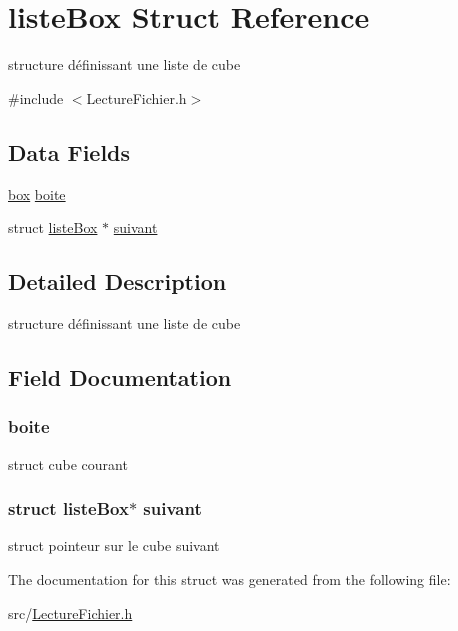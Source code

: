 \hypertarget{structliste_box}{
\section{listeBox Struct Reference}
\label{structliste_box}
}


structure définissant une liste de cube  




{\ttfamily \#include $<$LectureFichier.h$>$}

\subsection*{Data Fields}
\begin{DoxyCompactItemize}
\item 
\hyperlink{structbox}{box} \hyperlink{structliste_box_ae82892ba99cc7ad18186cb4883c2d2bd}{boite}
\item 
struct \hyperlink{structliste_box}{listeBox} $\ast$ \hyperlink{structliste_box_a8ec32af7a24ce88bbdfc453dd5bb0272}{suivant}
\end{DoxyCompactItemize}


\subsection{Detailed Description}
structure définissant une liste de cube 

\subsection{Field Documentation}
\hypertarget{structliste_box_ae82892ba99cc7ad18186cb4883c2d2bd}{
\subsubsection[{boite}]{ {\bf boite}}}
\label{structliste_box_ae82892ba99cc7ad18186cb4883c2d2bd}
struct cube courant \hypertarget{structliste_box_a8ec32af7a24ce88bbdfc453dd5bb0272}{
\subsubsection[{suivant}]{\setlength{\rightskip}{0pt plus 5cm}struct {\bf listeBox}$\ast$ {\bf suivant}}}
\label{structliste_box_a8ec32af7a24ce88bbdfc453dd5bb0272}
struct pointeur sur le cube suivant 

The documentation for this struct was generated from the following file:\begin{DoxyCompactItemize}
\item 
src/\hyperlink{_lecture_fichier_8h}{LectureFichier.h}\end{DoxyCompactItemize}
